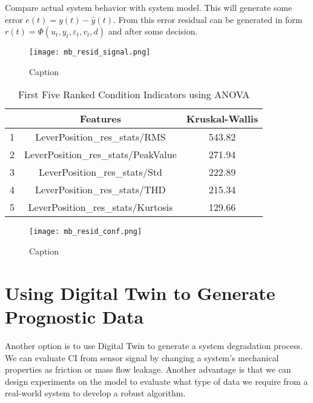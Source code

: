 Compare actual system behavior with system model. This will generate some
error $e(t) = y(t) - \hat{y}(t)$. From this error residual can be generated
in form $r(t)=\Phi(u_t,y_t, \varepsilon_t,v_t,d)$ and after some decision.

\begin{figure}[h!]
    \centering
    \texttt{[image: mb\_resid\_signal.png]}
    \caption{Caption}
    \label{fig:}
\end{figure}



\begin{table}[h!]
    \centering
    \begin{tabular}{|c|c|c|}
        \hline
          &        Features               & Kruskal-Wallis \\ \hline
        1 &   LeverPosition\_res\_stats/RMS	    & 543.82 \\ \hline  
        2 &   LeverPosition\_res\_stats/PeakValue	& 271.94 \\ \hline  
        3 &   LeverPosition\_res\_stats/Std	    & 222.89 \\ \hline  
        4 &   LeverPosition\_res\_stats/THD	    & 215.34 \\ \hline  
        5 &   LeverPosition\_res\_stats/Kurtosis	& 129.66 \\ \hline  
        \hline
    \end{tabular}
    \caption{First Five Ranked Condition Indicators using ANOVA}
    \label{tab:resid_sorted_ci}
\end{table}

\begin{figure}[h!]
    \centering
    \texttt{[image: mb\_resid\_conf.png]}
    \caption{Caption}
    \label{fig:}
\end{figure}





\section{Using Digital Twin to Generate Prognostic Data}
Another option is to use Digital Twin to generate a system degradation
process. We can evaluate CI from sensor signal by changing a system's
mechanical properties as friction or mass flow leakage.  Another advantage
is that we can design experiments on the model to evaluate what type of
data we require from a real-world system to develop a robust algorithm.


